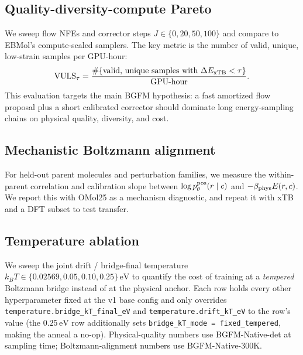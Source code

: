 \documentclass{article}
\begin{document}
\subsection{Quality-diversity-compute Pareto}

We sweep flow NFEs and corrector steps $J\in\{0,20,50,100\}$ and compare
to EBMol's compute-scaled samplers. The key metric is the number of
valid, unique, low-strain samples per GPU-hour:
\begin{equation}
    \mathrm{VULS}_\tau=\frac{\#\{\text{valid, unique samples with }\Delta E_{\rm xTB}<\tau\}}{\text{GPU-hour}}.
\end{equation}
This evaluation targets the main BGFM hypothesis: a fast amortized flow
proposal plus a short calibrated corrector should dominate long
energy-sampling chains on physical quality, diversity, and cost.

\subsection{Mechanistic Boltzmann alignment}

For held-out parent molecules and perturbation families, we measure the
within-parent correlation and calibration slope between
$\log p_\theta^{\rm pos}(r\mid c)$ and $-\beta_{\rm phys} E(r,c)$. We
report this with OMol25 as a mechanism diagnostic, and repeat it with xTB
and a DFT subset to test transfer.

\subsection{Temperature ablation}
\label{sec:exp:temperature}

We sweep the joint drift / bridge-final temperature
$k_B T \in \{0.02569, 0.05, 0.10, 0.25\}\,\mathrm{eV}$ to quantify the
cost of training at a \emph{tempered} Boltzmann bridge instead of at the
physical anchor. Each row holds every other hyperparameter fixed at the
v1 base config and only overrides
\texttt{temperature.bridge\_kT\_final\_eV} and \texttt{temperature.drift\_kT\_eV}
to the row's value (the $0.25\,\mathrm{eV}$ row additionally sets
\texttt{bridge\_kT\_mode = fixed\_tempered}, making the anneal a no-op).
Physical-quality numbers use BGFM-Native-det at sampling time;
Boltzmann-alignment numbers use BGFM-Native-300K.
\end{document}
